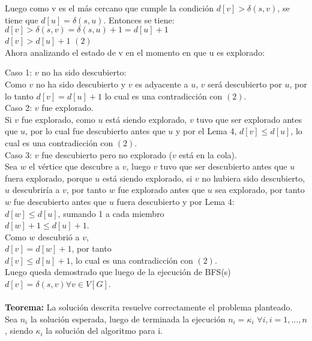 \documentclass[12pt]{article}
\begin{document}
Luego como v es el m\'as cercano que cumple la condici\'on $d[v] > \delta (s,v)$, se tiene que $d[u] = \delta (s,u)$.
Entonces se tiene:\\
 $d[v] > \delta (s,v) = \delta(s,u) + 1 =  d[u] + 1$\\
 $d[v] > d [u] + 1$   $(2)$ \\ 

Ahora analizando el estado de v en el momento en que u es explorado:

Caso 1: $v$ no ha sido descubierto:\\

Como $v$ no ha sido descubierto y $v$ es adyacente a $u$, $v$ ser\'a descubierto por $u$, por lo tanto $d[v]=d[u]+1$ lo cual es una contradicci\'on con $(2).$\\

Caso 2: $v$ fue explorado.\\

Si $v$ fue explorado, como $u$ est\'a siendo explorado, $v$ tuvo que ser explorado antes que $u$, por lo cual fue descubierto antes que $u$
 y por el Lema 4, $d[v] \leq d[u]$, lo cual es una contradicci\'on con $(2)$.\\

Caso 3: $v$ fue descubierto pero no explorado ($v$ est\'a en la cola).\\

Sea $w$ el v\'ertice que descubre a $v$, luego $v$ tuvo que ser descubierto antes que $u$ fuera explorado, porque $u$ est\'a siendo explorado, si $v$ no hubiera sido
descubierto, $u$ descubrir\'ia a $v$, por tanto $w$ fue explorado antes que $u$ sea explorado, por tanto $w$ fue descubierto antes que $u$ fuera descubierto 
y por Lema 4: \\
$ d[w] \leq d[u]$, sumando 1 a cada miembro \\
 $d[w] + 1 \leq d[u] + 1$. \\
 Como $w$ descubri\'o  a $v$,\\
 $d[v] = d[w] + 1$, por tanto\\
 
$d[v] \leq d[u] + 1$, lo cual es una contradicci\'on con $(2)$.\\

Luego queda demostrado que luego de la ejecuci\'on de BFS(s) $d[v] = \delta (s, v) \forall v \in V[G]$.\\
\\

\textbf{Teorema:} La soluci\'on descrita resuelve correctamente el problema planteado. Sea $n_i$ la soluci\'on esperada, luego de terminada la ejecuci\'on $n_i = \kappa_i$ $\forall i , i = 1,...,n$, siendo $\kappa_i$ la soluci\'on del algoritmo para i.\\
\end{document}
